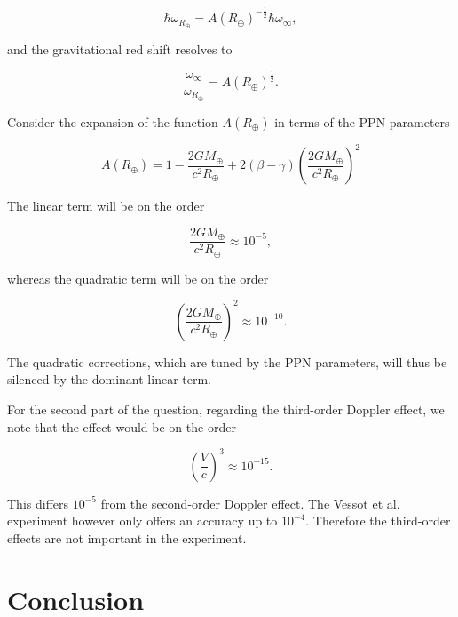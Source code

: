 \documentclass[11pt]{article}
\begin{document}
\begin{equation}
   \hbar \omega_{R_{\oplus}} = A(R_{\oplus})^{-\frac{1}{2}}\hbar \omega_{\infty},
\end{equation}

and the gravitational red shift resolves to

\begin{equation}
   \frac{\omega_{\infty}}{\omega_{R_{\oplus}}} = A(R_{\oplus})^{\frac{1}{2}}.
\end{equation}

Consider the expansion of the function $A(R_{\oplus})$ in terms of the PPN parameters

\begin{equation}
   A(R_{\oplus}) = 1 - \frac{2GM_{\oplus}}{c^2 R_{\oplus}} + 2 \left( \beta - \gamma \right) \left( \frac{2GM_{\oplus}}{c^2 R_{\oplus}} \right)^2
\end{equation}

The linear term will be on the order

\begin{equation}
   \frac{2GM_{\oplus}}{c^2 R_{\oplus}} \approx 10^{-5},
\end{equation}

whereas the quadratic term will be on the order 

\begin{equation}
   \left(\frac{2GM_{\oplus}}{c^2 R_{\oplus}}\right)^2 \approx 10^{-10}.
\end{equation}

The quadratic corrections, which are tuned by the PPN parameters, will thus be silenced by the dominant linear term. 

For the second part of the question, regarding the third-order Doppler effect, we note that the effect would be on the order

\begin{equation}
   \left(\frac{V}{c}\right)^3 \approx 10^{-15}.
\end{equation}

This differs $10^{-5}$ from the second-order Doppler effect. The Vessot et al. experiment however only offers an accuracy up to $10^{-4}$. Therefore the third-order effects are not important in the experiment.

\section{Conclusion}
\end{document}

